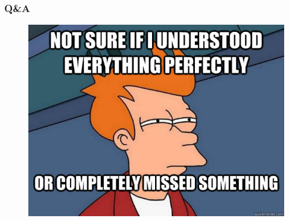 \documentclass{beamer}
\begin{document}
  \begin{frame}[foot]
    \frametitle{Q\&A}
    \begin{figure}
      \includegraphics[scale=.5]{./gfx/futurama-fry-meme-00020.jpg}
    \end{figure}
  \end{frame}


\end{document}
